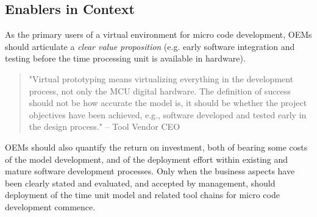 \subsection{Enablers in Context}


As the primary users of a virtual environment for micro code development, OEMs should articulate a \emph{clear value proposition} (e.g. early software integration and testing before the time processing unit is available in hardware).

\begin{quote}
"Virtual prototyping means virtualizing everything in the development process, not only the MCU digital hardware.
The definition of success should not be how accurate the model is, it should be whether the project objectives have been achieved, e.g., software developed and tested early in the design process."
-- Tool Vendor CEO
\end{quote}

OEMs should also quantify the return on investment, both of bearing some costs of the model development, and of the deployment effort within existing and mature software development processes.
Only when the business aspects have been clearly stated and evaluated, and accepted by management, should deployment of the time unit model and related tool chains for micro code development commence.




